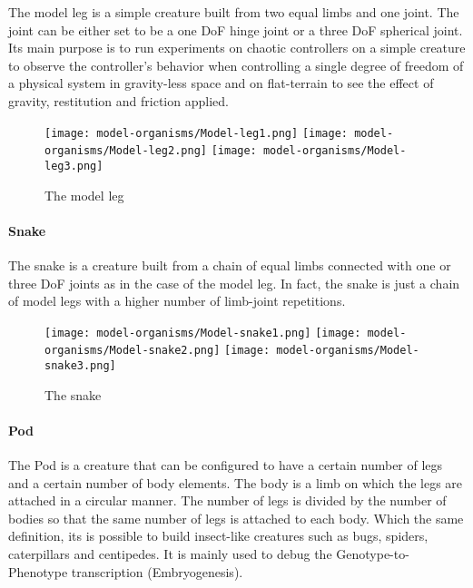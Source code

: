 \documentclass[main]{subfiles}
\begin{document}
The model leg is a simple creature built from two equal limbs and one joint. The joint can be either set to be a one DoF hinge joint or a three DoF spherical joint. Its main purpose is to run experiments on chaotic controllers on a simple creature to observe the controller's behavior when controlling a single degree of freedom of a physical system in gravity-less space and on flat-terrain to see the effect of gravity, restitution and friction applied.

\begin{figure}[!h]
\centering
\texttt{[image: model-organisms/Model-leg1.png]}
\texttt{[image: model-organisms/Model-leg2.png]}
\texttt{[image: model-organisms/Model-leg3.png]}
\caption[The model leg]{The model leg}
\label{figure:model-leg}
\end{figure}

\paragraph{Snake}

The snake is a creature built from a chain of equal limbs connected with one or three DoF joints as in the case of the model leg. In fact, the snake is just a chain of model legs with a higher number of limb-joint repetitions.

\begin{figure}[!h]
\centering
\texttt{[image: model-organisms/Model-snake1.png]}
\texttt{[image: model-organisms/Model-snake2.png]}
\texttt{[image: model-organisms/Model-snake3.png]}
\caption[The snake]{The snake}
\label{figure:snake}
\end{figure}


\paragraph{Pod}

The Pod is a creature that can be configured to have a certain number of legs and a certain number of body elements. The body is a limb on which the legs are attached in a circular manner. The number of legs is divided by the number of bodies so that the same number of legs is attached to each body. Which the same definition, its is possible to build insect-like creatures such as bugs, spiders, caterpillars and centipedes. It is mainly used to debug the Genotype-to-Phenotype transcription (Embryogenesis).
\end{document}
